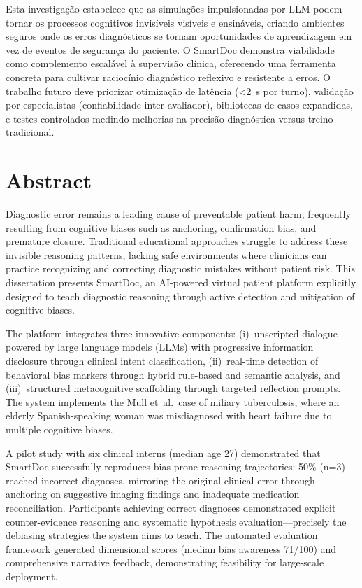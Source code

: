 Esta investigação estabelece que as simulações impulsionadas por LLM podem tornar os processos cognitivos invisíveis
visíveis e ensináveis, criando ambientes seguros onde os erros diagnósticos se tornam oportunidades de aprendizagem
em vez de eventos de segurança do paciente. O SmartDoc demonstra viabilidade como complemento escalável à supervisão
clínica, oferecendo uma ferramenta concreta para cultivar raciocínio diagnóstico reflexivo e resistente a erros. O
trabalho futuro deve priorizar otimização de latência (<2~s por turno), validação por especialistas (confiabilidade
inter-avaliador), bibliotecas de casos expandidas, e testes controlados medindo melhorias na precisão diagnóstica
versus treino tradicional.

\newpage

\chapter*{Abstract}

Diagnostic error remains a leading cause of preventable patient harm, frequently resulting from cognitive biases
such as anchoring, confirmation bias, and premature closure. Traditional educational approaches struggle to address
these invisible reasoning patterns, lacking safe environments where clinicians can practice recognizing and
correcting diagnostic mistakes without patient risk. This dissertation presents SmartDoc, an AI-powered virtual
patient platform explicitly designed to teach diagnostic reasoning through active detection and mitigation of
cognitive biases.

The platform integrates three innovative components: (i)~unscripted dialogue powered by large language models
(LLMs) with progressive information disclosure through clinical intent classification, (ii)~real-time detection of
behavioral bias markers through hybrid rule-based and semantic analysis, and (iii)~structured metacognitive
scaffolding through targeted reflection prompts. The system implements the Mull et~al.\ case of miliary
tuberculosis, where an elderly Spanish-speaking woman was misdiagnosed with heart failure due to multiple cognitive
biases.

A pilot study with six clinical interns (median age 27) demonstrated that SmartDoc successfully reproduces
bias-prone reasoning trajectories: 50\% (n=3) reached incorrect diagnoses, mirroring the original clinical error
through anchoring on suggestive imaging findings and inadequate medication reconciliation. Participants achieving
correct diagnoses demonstrated explicit counter-evidence reasoning and systematic hypothesis evaluation—precisely
the debiasing strategies the system aims to teach. The automated evaluation framework generated dimensional scores
(median bias awareness 71/100) and comprehensive narrative feedback, demonstrating feasibility for large-scale
deployment.

